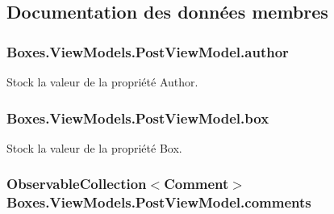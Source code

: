 \subsection{Documentation des données membres}
\subsubsection[{\texorpdfstring{author}{author}}]{ Boxes.\+View\+Models.\+Post\+View\+Model.\+author\hspace{0.3cm}{\ttfamily [private]}}\hypertarget{class_boxes_1_1_view_models_1_1_post_view_model_a636f0295b5a4ba46bc159d5b347dda3c}{}\label{class_boxes_1_1_view_models_1_1_post_view_model_a636f0295b5a4ba46bc159d5b347dda3c}


Stock la valeur de la propriété {\ttfamily Author}. 

\subsubsection[{\texorpdfstring{box}{box}}]{ Boxes.\+View\+Models.\+Post\+View\+Model.\+box\hspace{0.3cm}{\ttfamily [private]}}\hypertarget{class_boxes_1_1_view_models_1_1_post_view_model_a1beb2defa66dccf16c92b47013305205}{}\label{class_boxes_1_1_view_models_1_1_post_view_model_a1beb2defa66dccf16c92b47013305205}


Stock la valeur de la propriété {\ttfamily Box}. 

\subsubsection[{\texorpdfstring{comments}{comments}}]{\setlength{\rightskip}{0pt plus 5cm}Observable\+Collection$<${\bf Comment}$>$ Boxes.\+View\+Models.\+Post\+View\+Model.\+comments\hspace{0.3cm}{\ttfamily [private]}}\hypertarget{class_boxes_1_1_view_models_1_1_post_view_model_a3a9891cf2783a87c3c8357b31f96b911}{}\label{class_boxes_1_1_view_models_1_1_post_view_model_a3a9891cf2783a87c3c8357b31f96b911}


